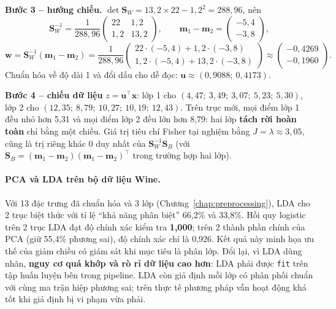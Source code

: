 \noindent\textbf{Bước 3 -- hướng chiếu.} $\det\mathbf{S}_W = 13{,}2 \times 22 - 1{,}2^2 = 288{,}96$, nên
\[
    \mathbf{S}_W^{-1} = \frac{1}{288{,}96}\begin{pmatrix} 22 & 1{,}2 \\ 1{,}2 & 13{,}2 \end{pmatrix}, \qquad
    \mathbf{m}_1 - \mathbf{m}_2 = \begin{pmatrix} -5{,}4 \\ -3{,}8 \end{pmatrix},
\]
\[
    \mathbf{w} = \mathbf{S}_W^{-1}(\mathbf{m}_1 - \mathbf{m}_2) = \frac{1}{288{,}96}\begin{pmatrix} 22 \cdot (-5{,}4) + 1{,}2 \cdot (-3{,}8) \\ 1{,}2 \cdot (-5{,}4) + 13{,}2 \cdot (-3{,}8) \end{pmatrix} \approx \begin{pmatrix} -0{,}4269 \\ -0{,}1960 \end{pmatrix}.
\]
Chuẩn hóa về độ dài 1 và đổi dấu cho dễ đọc: $\mathbf{u} \approx (0{,}9088;\ 0{,}4173)$.

\noindent\textbf{Bước 4 -- chiếu dữ liệu} $z = \mathbf{u}^\top\mathbf{x}$: lớp 1 cho $(4{,}47;\ 3{,}49;\ 3{,}07;\ 5{,}23;\ 5{,}30)$, lớp 2 cho $(12{,}35;\ 8{,}79;\ 10{,}27;\ 10{,}19;\ 12{,}43)$. Trên trục mới, mọi điểm lớp 1 đều nhỏ hơn 5,31 và mọi điểm lớp 2 đều lớn hơn 8,79: hai lớp \textbf{tách rời hoàn toàn} chỉ bằng một chiều. Giá trị tiêu chí Fisher tại nghiệm bằng $J = \lambda \approx 3{,}05$, cũng là trị riêng khác 0 duy nhất của $\mathbf{S}_W^{-1}\mathbf{S}_B$ (với $\mathbf{S}_B = (\mathbf{m}_1 - \mathbf{m}_2)(\mathbf{m}_1 - \mathbf{m}_2)^\top$ trong trường hợp hai lớp).

\paragraph{PCA và LDA trên bộ dữ liệu Wine.} Với 13 đặc trưng đã chuẩn hóa và 3 lớp (Chương~\ref{chap:preprocessing}), LDA cho 2 trục biệt thức với tỉ lệ ``khả năng phân biệt'' 66,2\% và 33,8\%. Hồi quy logistic trên 2 trục LDA đạt độ chính xác kiểm tra \textbf{1,000}; trên 2 thành phần chính của PCA (giữ 55,4\% phương sai), độ chính xác chỉ là 0,926. Kết quả này minh họa ưu thế của giảm chiều có giám sát khi mục tiêu là phân lớp. Đổi lại, vì LDA dùng nhãn, \textbf{nguy cơ quá khớp và rò rỉ dữ liệu cao hơn}: LDA phải được \texttt{fit} trên tập huấn luyện bên trong pipeline. LDA còn giả định mỗi lớp có phân phối chuẩn với cùng ma trận hiệp phương sai; trên thực tế phương pháp vẫn hoạt động khá tốt khi giả định bị vi phạm vừa phải.

